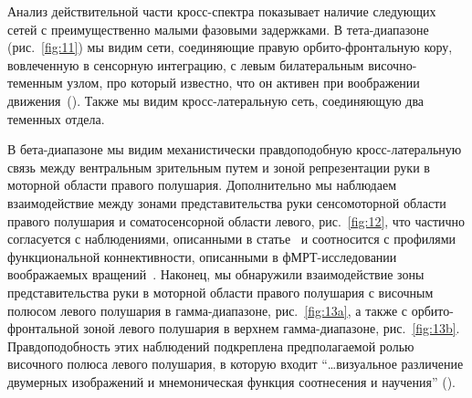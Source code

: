 Анализ действительной части кросс-спектра показывает наличие следующих сетей с преимущественно
малыми фазовыми задержками. В тета-диапазоне (рис.~\ref{fig:11}) мы видим сети,
соединяющие правую орбито-фронтальную кору, вовлеченную в сенсорную интеграцию, с левым
билатеральным височно-теменным узлом, про который известно, что он активен при воображении
движения~(\cite{Hanakawa2008}). Также мы видим кросс-латеральную сеть, соединяющую два
теменных отдела.

В бета-диапазоне мы видим механистически правдоподобную кросс-латеральную связь
между вентральным зрительным путем и зоной репрезентации руки в моторной
области правого полушария. Дополнительно мы наблюдаем взаимодействие между
зонами представительства руки сенсомоторной области правого полушария и
соматосенсорной области левого, рис.~\ref{fig:12}, что частично
согласуется с наблюдениями, описанными в статье~\cite{Lamm2007} и соотносится
с профилями функциональной коннективности, описанными в  фМРТ-исследовании
воображаемых вращений~\cite{Striem-Amit2017}. Наконец, мы обнаружили взаимодействие
зоны представительства руки в моторной области правого полушария с височным полюсом
левого полушария в гамма-диапазоне, рис.~\ref{fig:13a}, а также с
орбито-фронтальной зоной левого полушария в верхнем гамма-диапазоне, рис.~\ref{fig:13b}.
Правдоподобность этих наблюдений подкреплена предполагаемой
ролью височного полюса левого полушария, в которую входит ``\ldots визуальное различение
двумерных изображений и мнемоническая функция соотнесения и научения'' (\cite{Dupont2002}).

